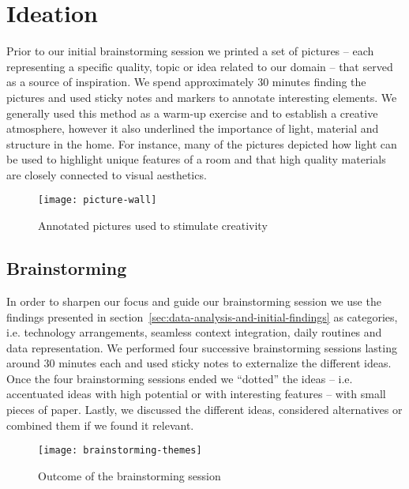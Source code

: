 \section{Ideation}
Prior to our initial brainstorming session we printed a set of pictures -- each representing a specific quality, topic or idea related to our domain -- that served as a source of inspiration. We spend approximately 30 minutes finding the pictures and used sticky notes and markers to annotate interesting elements. We generally used this method as a warm-up exercise and to establish a creative atmosphere, however it also underlined the importance of light, material and structure in the home. For instance, many of the pictures depicted how light can be used to highlight unique features of a room and that high quality materials are closely connected to visual aesthetics.

\begin{figure}[h]
	\centering
	\texttt{[image: picture-wall]}
	\caption{Annotated pictures used to stimulate creativity}
	\label{fig:picture-wall}
\end{figure}
\subsection{Brainstorming}

In order to sharpen our focus and guide our brainstorming session we use the findings presented in section~\ref{sec:data-analysis-and-initial-findings} as categories, i.e. technology arrangements, seamless context integration, daily routines and data representation. We performed four successive brainstorming sessions lasting around 30 minutes each and used sticky notes to externalize the different ideas. Once the four brainstorming sessions ended we “dotted” the ideas -- i.e. accentuated ideas with high potential or with interesting features -- with small pieces of paper. Lastly, we discussed the different ideas, considered alternatives or combined them if we found it relevant.

\begin{figure}[h]
	\centering
	\texttt{[image: brainstorming-themes]}
	\caption{Outcome of the brainstorming session}
	\label{fig:brainstorming-themes}
\end{figure}

